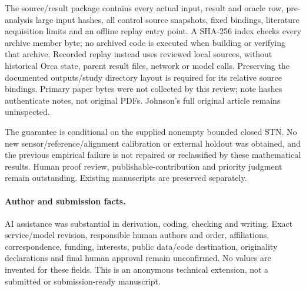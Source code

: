The source/result package contains every actual input, result and oracle row,
pre-analysis large input hashes, all control source snapshots, fixed bindings,
literature acquisition limits and an offline replay entry point. A SHA-256
index checks every archive member byte; no archived code is executed when
building or verifying that archive. Recorded replay instead uses reviewed
local sources, without historical Orca state, parent result files, network
or model calls. Preserving the documented outputs/study directory layout is
required for its relative source bindings. Primary paper bytes were not
collected by this review; note hashes authenticate notes, not original PDFs.
Johnson's full original article remains uninspected.

The guarantee is conditional on the supplied nonempty bounded closed STN.
No new sensor/reference/alignment calibration or external holdout was obtained,
and the previous empirical failure is not repaired or reclassified by these
mathematical results. Human proof review, publishable-contribution and priority
judgment remain outstanding. Existing manuscripts are preserved separately.

\paragraph{Author and submission facts.}
AI assistance was substantial in derivation, coding, checking and writing.
Exact service/model revision, responsible human authors and order,
affiliations, correspondence, funding, interests, public data/code destination,
originality declarations and final human approval remain unconfirmed.
No values are invented for these fields. This is an anonymous technical
extension, not a submitted or submission-ready manuscript.
